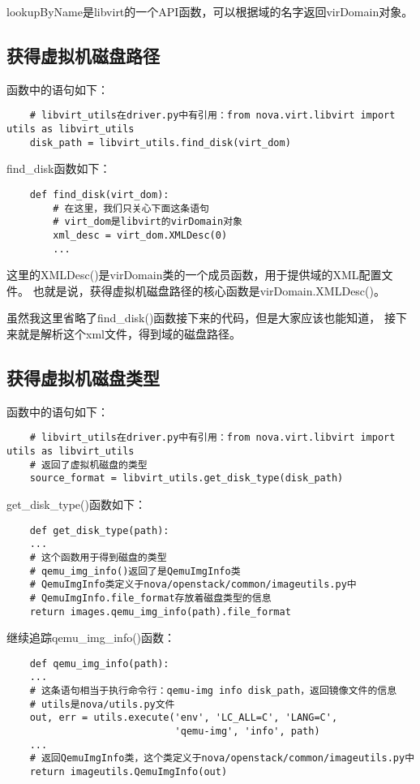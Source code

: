 \documentclass[a4paper,left=1.5cm,right=1.5cm,11pt]{article}
\begin{document}
	lookupByName是libvirt的一个API函数，可以根据域的名字返回virDomain对象。

\subsection{获得虚拟机磁盘路径}
	函数中的语句如下：
	\begin{lstlisting}
	# libvirt_utils在driver.py中有引用：from nova.virt.libvirt import utils as libvirt_utils
	disk_path = libvirt_utils.find_disk(virt_dom)
	\end{lstlisting}

	find\_disk函数如下：
	\begin{lstlisting}
	def find_disk(virt_dom):
		# 在这里，我们只关心下面这条语句
		# virt_dom是libvirt的virDomain对象
		xml_desc = virt_dom.XMLDesc(0)
		...
	\end{lstlisting}

	这里的XMLDesc()是virDomain类的一个成员函数，用于提供域的XML配置文件。
	也就是说，获得虚拟机磁盘路径的核心函数是virDomain.XMLDesc()。\par

	虽然我这里省略了find\_disk()函数接下来的代码，但是大家应该也能知道，
	接下来就是解析这个xml文件，得到域的磁盘路径。

\subsection{获得虚拟机磁盘类型}
	函数中的语句如下：
	\begin{lstlisting}
	# libvirt_utils在driver.py中有引用：from nova.virt.libvirt import utils as libvirt_utils
	# 返回了虚拟机磁盘的类型
	source_format = libvirt_utils.get_disk_type(disk_path)
	\end{lstlisting}

	get\_disk\_type()函数如下：
	\begin{lstlisting}
	def get_disk_type(path):
    ...
	# 这个函数用于得到磁盘的类型
	# qemu_img_info()返回了是QemuImgInfo类
	# QemuImgInfo类定义于nova/openstack/common/imageutils.py中
	# QemuImgInfo.file_format存放着磁盘类型的信息
    return images.qemu_img_info(path).file_format
	\end{lstlisting}

	继续追踪qemu\_img\_info()函数：
	\begin{lstlisting}
	def qemu_img_info(path):
    ...
	# 这条语句相当于执行命令行：qemu-img info disk_path，返回镜像文件的信息
	# utils是nova/utils.py文件
    out, err = utils.execute('env', 'LC_ALL=C', 'LANG=C',
                             'qemu-img', 'info', path)
    ...
	# 返回QemuImgInfo类，这个类定义于nova/openstack/common/imageutils.py中
    return imageutils.QemuImgInfo(out)
	\end{lstlisting}
\end{document}
